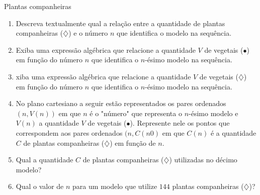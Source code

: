 \begin{task}{Plantas companheiras}
\begin{enumerate}
\item Descreva textualmente qual a relação entre a quantidade de plantas companheiras ({\Large$\diamondsuit$}) e o número $n$ que identifica o modelo na sequência.
\item Exiba uma expressão algébrica que relacione a quantidade $V$ de vegetais ({\Large$\bullet$}) em função do número $n$ que identifica o $n$-ésimo modelo na sequência.
\item xiba uma expressão algébrica que relacione a quantidade $V$ de vegetais ({\Large$\diamondsuit$}) em função do número $n$ que identifica o $n$-ésimo modelo na sequência.
\item No plano cartesiano a seguir estão representados os pares ordenados $(n,V(n))$ em que $n$ é o "número"{} que representa o $n$-ésimo modelo e $V(n)$ a quantidade $V$ de vegetais ({\Large$\bullet$}). Represente nele os pontos que correspondem aos pares ordenados $(n,C(n0)$ em que $C(n)$ é a quantidade $C$ de plantas companheiras ({\Large$\diamondsuit$}) em função de $n$.

\begin{figure}[H]
\centering
{}

\end{figure}
\item Qual a quantidade $C$ de plantas companheiras ({\Large$\diamondsuit$}) utilizadas no décimo modelo?
\item Qual o valor de $n$ para um modelo que utilize $144$ plantas companheiras ({\Large$\diamondsuit$})?
\end{enumerate}
\end{task}

